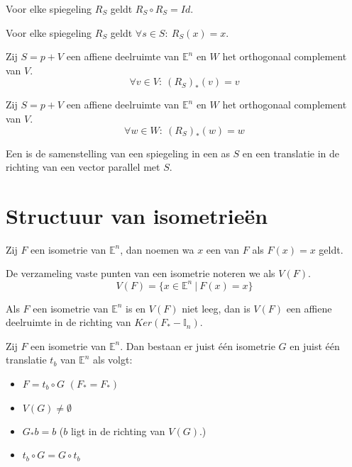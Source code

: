 \documentclass[main.tex]{subfiles}
\begin{document}
\begin{st}
  Voor elke spiegeling $R_{S}$ geldt $R_{S} \circ R_{S} = Id$.
\end{st}

\begin{st}
  Voor elke spiegeling $R_{S}$ geldt $\forall s \in S:\ R_{S}(x) = x$.
\end{st}

\begin{lem}
  Zij $S=p+V$ een affiene deelruimte van $\mathbb{E}^{n}$ en $W$ het orthogonaal complement van $V$.
  \[ \forall v\in V:\ (R_{S})_{*}(v) = v \]
\end{lem}

\begin{lem}
  Zij $S=p+V$ een affiene deelruimte van $\mathbb{E}^{n}$ en $W$ het orthogonaal complement van $V$.
  \[ \forall w\in W:\ (R_{S})_{*}(w) = w \]
\end{lem}

\begin{de}
  Een  is de samenstelling van een spiegeling in een as $S$ en een translatie in de richting van een vector parallel met $S$.
\end{de}

\section{Structuur van isometrie\"en}
\label{sec:struct-van-isom}

\begin{de}
  Zij $F$ een isometrie van $\mathbb{E}^{n}$, dan noemen wa $x$ een  van $F$ als $F(x)=x$ geldt.
\end{de}

\begin{de}
  De verzameling vaste punten van een isometrie noteren we als $V(F)$.
  \[ V(F) = \{ x \in \mathbb{E}^{n} \ |\ F(x) = x \} \]
\end{de}

\begin{st}
  Als $F$ een isometrie van $\mathbb{E}^{n}$ is en $V(F)$ niet leeg, dan is $V(F)$ een affiene deelruimte in de richting van $Ker(F_{*}-\mathbb{I}_{n})$.
\end{st}

\begin{st}
  Zij $F$ een isometrie van $\mathbb{E}^{n}$.
  Dan bestaan er juist \'e\'en isometrie $G$ en juist \'e\'en translatie $t_{b}$ van $\mathbb{E}^{n}$ als volgt:
  \begin{itemize}
  \item $F = t_{b} \circ G$ $(F_{*} = F_{*})$
  \item $V(G) \neq \emptyset$
  \item $G_{*}b = b$ ($b$ ligt in de richting van $V(G)$.)
  \item $t_{b}\circ G = G \circ t_{b}$
  \end{itemize}
\end{st}
\end{document}
